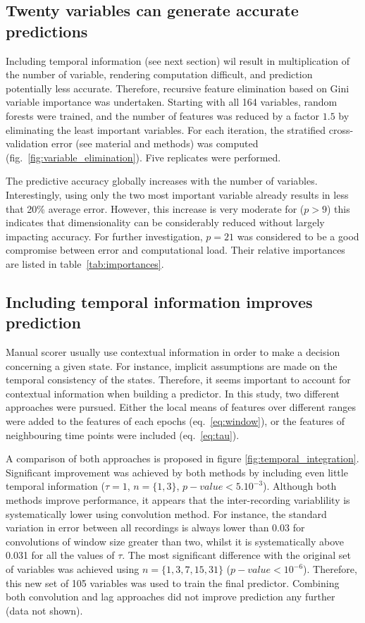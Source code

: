 \subsection{Twenty variables can generate accurate predictions}
Including temporal information (see next section) wil result in multiplication of the number of variable, rendering computation difficult, and prediction potentially less accurate.
Therefore, recursive feature elimination\cite{menze_comparison_2009} based on
Gini variable importance was undertaken.
Starting with all 164 variables, random forests were trained, and the number of features was reduced by a factor $1.5$  by eliminating the least important variables.
For each iteration, the stratified cross-validation error (see material and methods) was computed (fig.~\ref{fig:variable_elimination}). Five replicates were performed.


The predictive accuracy globally increases with the number of variables.
Interestingly, using only the two most important variable already results in less that 20\% average error.
However, this increase is very moderate for ($p>9$) this indicates that dimensionality can be considerably reduced without largely impacting accuracy.
For further investigation, $p=21$ was considered to be a good compromise between error and computational load. Their relative importances are listed in table~\ref{tab:importances}.


\subsection{Including temporal information improves prediction}
Manual scorer usually use contextual information in order to make a decision concerning a given state.
For instance, implicit assumptions are made on the temporal consistency of the states.
Therefore, it seems important to account for contextual information when building a predictor.
In this study, two different approaches were pursued.
Either the local means of features over different ranges were added to the features
of each epochs (eq.~\ref{eq:window}),
or the features of neighbouring time points were included (eq.~\ref{eq:tau}).

A comparison of both approaches is proposed in figure \ref{fig:temporal_integration}.
Significant improvement was achieved by both methods by including even little temporal information ($\tau = 1$, $n=\{1,3\}$, $p-value < 5.10^{-3}$).
Although both methods improve performance, it appears that the inter-recording variablility is systematically lower using convolution method.
For instance, the standard variation in error between all recordings is always lower than 0.03 for convolutions of window size greater than two,
whilst it is systematically above 0.031 for all the values of $\tau$.
The most significant difference with the original set of variables was achieved using $n = \{1,3,7,15,31\}$ ($p-value < 10^{-6}$).
Therefore, this new set of 105 variables was used to train the final predictor.
Combining both convolution and lag approaches did not improve prediction any further (data not shown).

